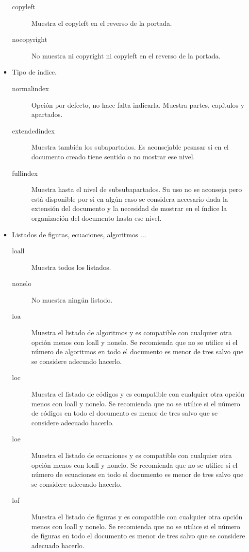 \begin{itemize}
\begin{description}
    \item [copyleft] Muestra el copyleft en el reverso de la portada.
    \item [nocopyright] No muestra ni copyright ni copyleft en el reverso de la portada.
  \end{description}
  \item Tipo de índice.
  \begin{description}
    \item [normalindex] Opción por defecto, no hace falta indicarla. Muestra partes, capítulos y apartados.
    \item [extendedindex] Muestra también los subapartados. Es aconsejable pesnsar si en el documento creado tiene sentido o no mostrar ese nivel.
    \item [fullindex] Muestra hasta el nivel de subsubapartados. Su uso no se aconseja pero está disponible por si en algún caso se considera necesario dada la extensión del documento y la necesidad de mostrar en el índice la organización del documento hasta ese nivel.
  \end{description}
  \item Listados de figuras, ecuaciones, algoritmos ...
  \begin{description}
    \item [loall] Muestra todos los listados.
    \item [nonelo] No muestra ningún listado.
    \item [loa] Muestra el listado de algoritmos y es compatible con cualquier otra opción menos con loall y nonelo. Se recomienda que no se utilice si el número de algoritmos en todo el documento es menor de tres salvo que se considere adecuado hacerlo.
    \item [loc] Muestra el listado de códigos y es compatible con cualquier otra opción menos con loall y nonelo. Se recomienda que no se utilice si el número de códigos en todo el documento es menor de tres salvo que se considere adecuado hacerlo.
    \item [loe] Muestra el listado de ecuaciones y es compatible con cualquier otra opción menos con loall y nonelo. Se recomienda que no se utilice si el número de ecuaciones en todo el documento es menor de tres salvo que se considere adecuado hacerlo.
    \item [lof] Muestra el listado de figuras y es compatible con cualquier otra opción menos con loall y nonelo. Se recomienda que no se utilice si el número de figuras en todo el documento es menor de tres salvo que se considere adecuado hacerlo.

\end{description}
\end{itemize}
